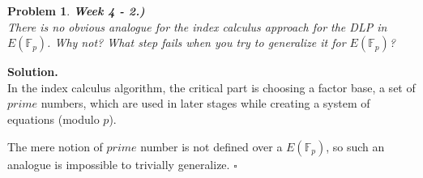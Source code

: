 \documentclass[12pt]{article}
\newtheorem{problem}{Problem}
\newenvironment{solution}[1][\textbf{Solution}]{\textbf{#1.} }{$\square$}
\begin{document}
\begin{problem} \textbf{Week 4 - 2.)} \\ 

There is no obvious analogue for the index calculus approach for the DLP in $E(\mathbb{F}_p)$. Why not? What step fails when you try to generalize it for $E(\mathbb{F}_p)$?
\end{problem}
\begin{solution} \\
In the index calculus algorithm, the critical part is choosing a factor base, a set of $prime$ numbers, which are used in later stages while creating a system of equations (modulo $p$).

The mere notion of $prime$ number is not defined over a $E(\mathbb{F}_p)$, so such an analogue is impossible to trivially generalize. 
\end{solution}
\end{document}
